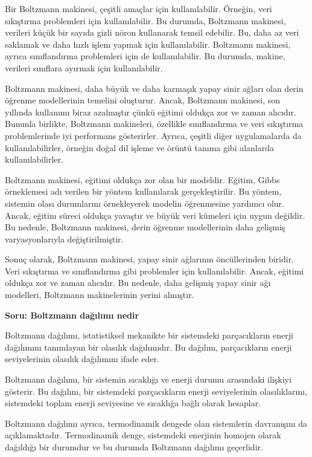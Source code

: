 \documentclass[11pt]{article}
\begin{document}
Bir Boltzmann makinesi, çeşitli amaçlar için kullanılabilir. Örneğin, veri sıkıştırma problemleri için kullanılabilir. Bu durumda, Boltzmann makinesi, verileri küçük bir sayıda gizli nöron kullanarak temsil edebilir. Bu, daha az veri saklamak ve daha hızlı işlem yapmak için kullanılabilir. Boltzmann makinesi, ayrıca sınıflandırma problemleri için de kullanılabilir. Bu durumda, makine, verileri sınıflara ayırmak için kullanılabilir.

Boltzmann makinesi, daha büyük ve daha karmaşık yapay sinir ağları olan derin öğrenme modellerinin temelini oluşturur. Ancak, Boltzmann makinesi, son yıllında kullanımı biraz azalmıştır çünkü eğitimi oldukça zor ve zaman alıcıdır. Bununla birlikte, Boltzmann makineleri, özellikle sınıflandırma ve veri sıkıştırma problemlerinde iyi performans gösterirler. Ayrıca, çeşitli diğer uygulamalarda da kullanılabilirler, örneğin doğal dil işleme ve örüntü tanıma gibi alanlarda kullanılabilirler.

Boltzmann makinesi, eğitimi oldukça zor olan bir modeldir. Eğitim, Gibbs örneklemesi adı verilen bir yöntem kullanılarak gerçekleştirilir. Bu yöntem, sistemin olası durumlarını örnekleyerek modelin öğrenmesine yardımcı olur. Ancak, eğitim süreci oldukça yavaştır ve büyük veri kümeleri için uygun değildir. Bu nedenle, Boltzmann makinesi, derin öğrenme modellerinin daha gelişmiş varyasyonlarıyla değiştirilmiştir.

Sonuç olarak, Boltzmann makinesi, yapay sinir ağlarının öncüllerinden biridir. Veri sıkıştırma ve sınıflandırma gibi problemler için kullanılabilir. Ancak, eğitimi oldukça zor ve zaman alıcıdır. Bu nedenle, daha gelişmiş yapay sinir ağı modelleri, Boltzmann makinelerinin yerini almıştır.

\textbf{Soru: Boltzmann dağılımı nedir}

Boltzmann dağılımı, istatistiksel mekanikte bir sistemdeki parçacıkların enerji dağılımını tanımlayan bir olasılık dağılımıdır. Bu dağılım, parçacıkların enerji seviyelerinin olasılık dağılımını ifade eder.

Boltzmann dağılımı, bir sistemin sıcaklığı ve enerji durumu arasındaki ilişkiyi gösterir. Bu dağılım, bir sistemdeki parçacıkların enerji seviyelerinin olasılıklarını, sistemdeki toplam enerji seviyesine ve sıcaklığa bağlı olarak hesaplar.

Boltzmann dağılımı ayrıca, termodinamik dengede olan sistemlerin davranışını da açıklamaktadır. Termodinamik denge, sistemdeki enerjinin homojen olarak dağıldığı bir durumdur ve bu durumda Boltzmann dağılımı geçerlidir.
\end{document}
